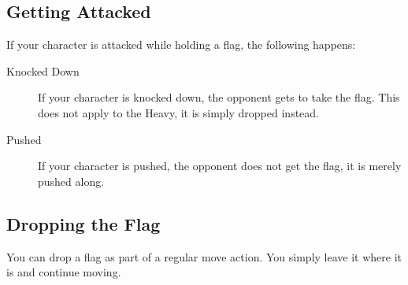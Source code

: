 \subsection{Getting Attacked}
If your character is attacked while holding a flag, the following happens:
\begin{description}
\item[Knocked Down] If your character is knocked down, the opponent gets to take the flag. This does not apply to the Heavy, it is simply dropped instead.
\item[Pushed] If your character is pushed, the opponent does not get the flag, it is merely pushed along.
\end{description}

\subsection{Dropping the Flag}
You can drop a flag as part of a regular move action. You simply leave it where it is and continue moving.